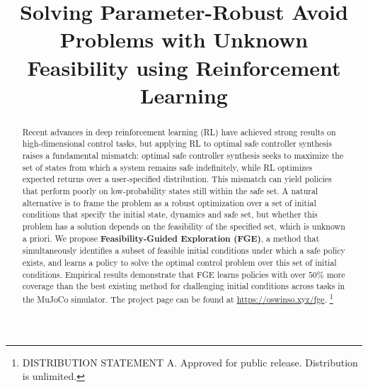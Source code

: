 \documentclass{article} %
\title{Solving Parameter-Robust Avoid Problems with Unknown Feasibility using Reinforcement Learning}
\author{Oswin So\thanks{These authors contributed equally to this work.}~~$^{1}$ \hskip1em Eric Yang Yu$^{\ast1}$ \hskip1em Songyuan Zhang$^{1}$ \\ \textbf{Matthew Cleaveland}$^2$ \hskip1em \textbf{Mitchell Black}$^2$ \hskip1em \textbf{Chuchu Fan}$^1$ \\
$^1$Department of Aeronautics and Astronautics, MIT \quad $^2$MIT Lincoln Laboratory \\
\texttt{\{oswinso,eyyu\}@mit.edu}
\vspace{-1.5em}
}
\begin{document}
\maketitle

\begin{abstract}
    \vspace{-0.5em}
    Recent advances in deep reinforcement learning (RL) have achieved strong results on high-dimensional control tasks,
    but applying RL to optimal safe controller synthesis raises a fundamental mismatch: optimal safe controller synthesis seeks to maximize the set of states from which a system remains safe indefinitely, while RL optimizes expected returns over a user-specified distribution.
    This mismatch can yield policies that perform poorly on low-probability states still within the safe set.
    A natural alternative is to frame the problem as a robust optimization over a set of initial conditions that specify the initial state, dynamics and safe set, but whether this problem has a solution depends on the feasibility of the specified set, which is unknown a priori.
    We propose \textbf{Feasibility-Guided Exploration (FGE)}, a method that simultaneously identifies a subset of feasible initial conditions under which a safe policy exists, and learns a policy to solve the
    optimal control
    problem over this set of initial conditions.
    Empirical results demonstrate that FGE learns policies with over $50\%$ more coverage than the best existing method for challenging initial conditions across tasks in the MuJoCo simulator.
    The project page can be found at \href{https://oswinso.xyz/fge?utm_source=fge_pdf}{https://oswinso.xyz/fge}.
    \footnote{DISTRIBUTION STATEMENT A. Approved for public release. Distribution is unlimited.}
\end{abstract}
\vspace{-1.5em}
\end{document}
